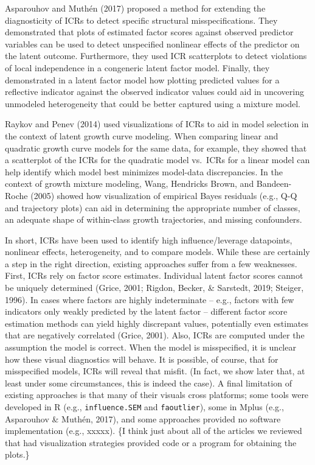 \documentclass[
  english,
  doc]{apa6}
\begin{document}
Asparouhov and Muthén (2017) proposed a method for extending the diagnosticity of ICRs to detect specific structural misspecifications. They demonstrated that plots of estimated factor scores against observed predictor variables can be used to detect unspecified nonlinear effects of the predictor on the latent outcome. Furthermore, they used ICR scatterplots to detect violations of local independence in a congeneric latent factor model. Finally, they demonstrated in a latent factor model how plotting predicted values for a reflective indicator against the observed indicator values could aid in uncovering unmodeled heterogeneity that could be better captured using a mixture model.

Raykov and Penev (2014) used visualizations of ICRs to aid in model selection in the context of latent growth curve modeling. When comparing linear and quadratic growth curve models for the same data, for example, they showed that a scatterplot of the ICRs for the quadratic model vs.~ICRs for a linear model can help identify which model best minimizes model-data discrepancies. In the context of growth mixture modeling, Wang, Hendricks Brown, and Bandeen-Roche (2005) showed how visualization of empirical Bayes residuals (e.g., Q-Q and trajectory plots) can aid in determining the appropriate number of classes, an adequate shape of within-class growth trajectories, and missing confounders.

In short, ICRs have been used to identify high influence/leverage datapoints, nonlinear effects, heterogeneity, and to compare models. While these are certainly a step in the right direction, existing approaches suffer from a few weaknesses. First, ICRs rely on factor score estimates. Individual latent factor scores cannot be uniquely determined (Grice, 2001; Rigdon, Becker, \& Sarstedt, 2019; Steiger, 1996). In cases where factors are highly indeterminate -- e.g., factors with few indicators only weakly predicted by the latent factor -- different factor score estimation methods can yield highly discrepant values, potentially even estimates that are negatively correlated (Grice, 2001). Also, ICRs are computed under the assumption the model is correct. When the model is misspecified, it is unclear how these visual diagnostics will behave. It is possible, of course, that for misspecified models, ICRs will reveal that misfit. (In fact, we show later that, at least under some circumstances, this is indeed the case). A final limitation of existing approaches is that many of their visuals cross platforms; some tools were developed in R (e.g., \texttt{influence.SEM} and \texttt{faoutlier}), some in Mplus (e.g., Asparouhov \& Muthén, 2017), and some approaches provided no software implementation (e.g., xxxxx). \{I think just about all of the articles we reviewed that had visualization strategies provided code or a program for obtaining the plots.\}
\end{document}
